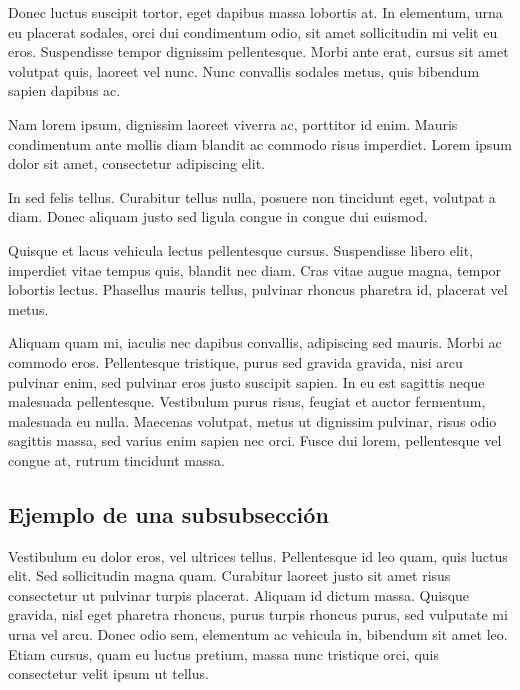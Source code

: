\documentclass[11pt,a4paper]{article}
\begin{document}
Donec luctus suscipit tortor, eget dapibus massa lobortis at. In elementum, urna eu placerat sodales, orci dui condimentum odio, sit amet sollicitudin mi velit eu eros. Suspendisse tempor dignissim pellentesque. Morbi ante erat, cursus sit amet volutpat quis, laoreet vel nunc. Nunc convallis sodales metus, quis bibendum sapien dapibus ac. 


Nam lorem ipsum, dignissim laoreet viverra ac, porttitor id enim. Mauris condimentum ante mollis diam blandit ac commodo risus imperdiet. Lorem ipsum dolor sit amet, consectetur adipiscing elit. 


In sed felis tellus. Curabitur tellus nulla, posuere non tincidunt eget, volutpat a diam. Donec aliquam justo sed ligula congue in congue dui euismod.


Quisque et lacus vehicula lectus pellentesque cursus. Suspendisse libero elit, imperdiet vitae tempus quis, blandit nec diam. Cras vitae augue magna, tempor lobortis lectus. Phasellus mauris tellus, pulvinar rhoncus pharetra id, placerat vel metus. 


Aliquam quam mi, iaculis nec dapibus convallis, adipiscing sed mauris. Morbi ac commodo eros. Pellentesque tristique, purus sed gravida gravida, nisi arcu pulvinar enim, sed pulvinar eros justo suscipit sapien. In eu est sagittis neque malesuada pellentesque. Vestibulum purus risus, feugiat et auctor fermentum, malesuada eu nulla. Maecenas volutpat, metus ut dignissim pulvinar, risus odio sagittis massa, sed varius enim sapien nec orci. Fusce dui lorem, pellentesque vel congue at, rutrum tincidunt massa.



\subsection{Ejemplo de una subsubsección}


Vestibulum eu dolor eros, vel ultrices tellus. Pellentesque id leo quam, quis luctus elit. Sed sollicitudin magna quam. Curabitur laoreet justo sit amet risus consectetur ut pulvinar turpis placerat. Aliquam id dictum massa. Quisque gravida, nisl eget pharetra rhoncus, purus turpis rhoncus purus, sed vulputate mi urna vel arcu. Donec odio sem, elementum ac vehicula in, bibendum sit amet leo. Etiam cursus, quam eu luctus pretium, massa nunc tristique orci, quis consectetur velit ipsum ut tellus. 
\end{document}
